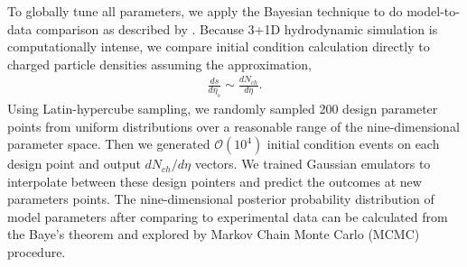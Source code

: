 \documentclass[3p,times,twocolumn]{elsarticle}
\begin{document}
To globally tune all parameters, we apply the Bayesian technique to do model-to-data comparison as described by \cite{Bernhard:2015hxa}.
Because 3+1D hydrodynamic simulation is computationally intense, we compare initial condition calculation directly to charged particle densities assuming the approximation,
\begin{eqnarray}
\frac{ds}{d\eta_s} \sim \frac{dN_{ch}}{d\eta}.
\end{eqnarray}
Using Latin-hypercube sampling, we randomly sampled 200 design parameter points from uniform distributions over a reasonable range of the nine-dimensional parameter space. Then we generated $\mathcal{O}(10^4)$ initial condition events on each design point and output $dN_{ch}/d\eta$ vectors.
We trained Gaussian emulators to interpolate between these design pointers and predict the outcomes at new parameters points.
The nine-dimensional posterior probability distribution of model parameters after comparing to experimental data can be calculated from the Baye's theorem and explored by Markov Chain Monte Carlo (MCMC) procedure.
\end{document}
